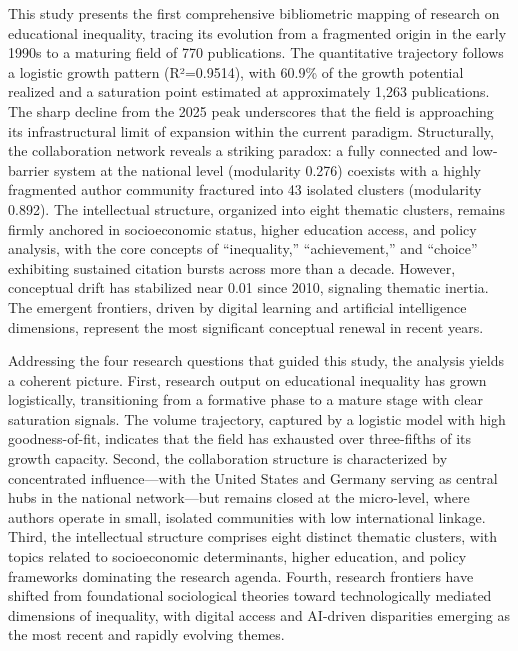 \documentclass[12pt,a4paper]{article}
\begin{document}
This study presents the first comprehensive bibliometric mapping of research on educational inequality, tracing its evolution from a fragmented origin in the early 1990s to a maturing field of 770 publications. The quantitative trajectory follows a logistic growth pattern (R²=0.9514), with 60.9\% of the growth potential realized and a saturation point estimated at approximately 1,263 publications. The sharp decline from the 2025 peak underscores that the field is approaching its infrastructural limit of expansion within the current paradigm. Structurally, the collaboration network reveals a striking paradox: a fully connected and low-barrier system at the national level (modularity 0.276) coexists with a highly fragmented author community fractured into 43 isolated clusters (modularity 0.892). The intellectual structure, organized into eight thematic clusters, remains firmly anchored in socioeconomic status, higher education access, and policy analysis, with the core concepts of “inequality,” “achievement,” and “choice” exhibiting sustained citation bursts across more than a decade. However, conceptual drift has stabilized near 0.01 since 2010, signaling thematic inertia. The emergent frontiers, driven by digital learning and artificial intelligence dimensions, represent the most significant conceptual renewal in recent years.

Addressing the four research questions that guided this study, the analysis yields a coherent picture. First, research output on educational inequality has grown logistically, transitioning from a formative phase to a mature stage with clear saturation signals. The volume trajectory, captured by a logistic model with high goodness-of-fit, indicates that the field has exhausted over three-fifths of its growth capacity. Second, the collaboration structure is characterized by concentrated influence—with the United States and Germany serving as central hubs in the national network—but remains closed at the micro-level, where authors operate in small, isolated communities with low international linkage. Third, the intellectual structure comprises eight distinct thematic clusters, with topics related to socioeconomic determinants, higher education, and policy frameworks dominating the research agenda. Fourth, research frontiers have shifted from foundational sociological theories toward technologically mediated dimensions of inequality, with digital access and AI-driven disparities emerging as the most recent and rapidly evolving themes.
\end{document}
